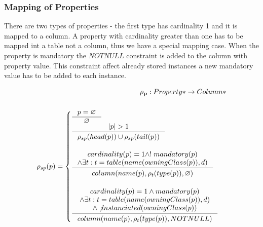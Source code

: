 \documentclass[11pt]{article}
\begin{document}
\subsubsection{Mapping of Properties}
There are two types of properties - the first type has cardinality 1  and it is mapped to a column. A property with cardinality greater than one has to be mapped int a table not a column, thus we have a special mapping case. When the property is mandatory the $NOTNULL$ constraint is added to the column with property value. This constraint affect already stored instances a new mandatory value has to be added to each instance.

\begin{align*}
	\mathbf{\rho_p} : Property* \rightarrow Column* \\ \\
	\rho_{sp}(p) = \begin{cases}
		\inference{p = \varnothing}{\varnothing}\\
		\inference{|p| > 1}{\rho_{sp}(head(p)) \cup \rho_{sp}(tail(p))}\\\\
 		\inference{cardinality(p) = 1 \wedge !\;mandatory(p)
 			\\ \wedge \exists t : t = table(name(owningClass(p)), d) 
		 }{\begin{gathered}
	  		column(name(p), \rho_t(type(p)), \varnothing )
		\end{gathered}} \\ \\
  		\inference{cardinality(p) = 1 \wedge mandatory(p)
			 \\ \wedge \exists t : t = table(name(owningClass(p)), d)
			\\ \wedge \not instanciated(owningClass(p))
		}{\begin{gathered}
 	 		column(name(p), \rho_t(type(p)), NOTNULL ) \\ 
		\end{gathered}}
 	\end{cases}
\end{align*}
\end{document}

